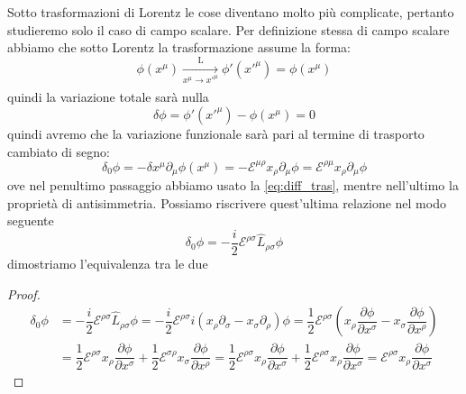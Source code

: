 Sotto trasformazioni di Lorentz le cose diventano molto più complicate, pertanto studieremo solo il caso di campo scalare.
Per definizione stessa di campo scalare abbiamo che sotto Lorentz la trasformazione assume la forma:
\begin{equation}
  \phi(x^\mu)\xrightarrow[\text{$x^\mu\xrightarrow[\text{}]{\text{}}x'^{\mu} $}]{\text{L}}\phi'(x'^{\mu})=\phi(x^\mu)
\end{equation}
quindi la variazione totale sarà nulla
\begin{equation}
    \delta \phi=\phi'(x'^\mu)-\phi(x^\mu)=0
\end{equation}
quindi avremo che la variazione funzionale sarà pari al termine di trasporto cambiato di segno:
\begin{equation}
    \delta_0 \phi =-\delta x^\mu\partial_\mu \phi(x^\mu)=-\mathcal{E}^{\mu\rho} x_\rho\partial_\mu \phi=\mathcal{E}^{\rho\mu}x_\rho \partial_\mu \phi
\end{equation}
ove nel penultimo passaggio abbiamo usato la \eqref{eq:diff_tras}, mentre nell'ultimo la proprietà di antisimmetria.
Possiamo riscrivere quest'ultima relazione nel modo seguente 
\begin{equation}
    \delta_0 \phi =-\dfrac{i}{2}\mathcal{E}^{\rho\sigma}\hat{L}_{\rho\sigma}\phi
\end{equation}
dimostriamo l'equivalenza tra le due 
\begin{proof}
    \begin{equation}
        \begin{aligned}
            \delta_0 \phi &=-\dfrac{i}{2}\mathcal{E}^{\rho\sigma}\hat{L}_{\rho\sigma}\phi=-\dfrac{i}{2}\mathcal{E}^{\rho\sigma}i(x_\rho\partial_\sigma-x_\sigma\partial_\rho)\phi=\dfrac{1}{2}\mathcal{E}^{\rho\sigma}\left(x_\rho\dfrac{\partial \phi}{\partial x^\sigma}-x_\sigma\dfrac{\partial \phi}{\partial x^\rho}\right)\\
            &=\dfrac{1}{2}\mathcal{E}^{\rho\sigma}x_\rho\dfrac{\partial \phi}{\partial x^\sigma}+\dfrac{1}{2}\mathcal{E}^{\sigma\rho}x_\sigma\dfrac{\partial \phi}{\partial x^\rho}=\dfrac{1}{2}\mathcal{E}^{\rho\sigma}x_\rho\dfrac{\partial \phi}{\partial x^\sigma}+\dfrac{1}{2}\mathcal{E}^{\rho\sigma}x_\rho\dfrac{\partial \phi}{\partial x^\sigma}=\mathcal{E}^{\rho\sigma}x_\rho\dfrac{\partial \phi}{\partial x^\sigma}
        \end{aligned}
    \end{equation}
\end{proof}

